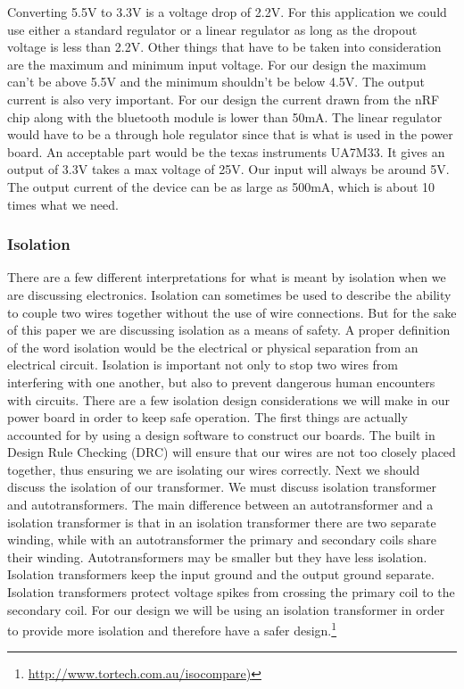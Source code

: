 Converting 5.5V to 3.3V is a voltage drop of 2.2V. For this application we
could use either a standard regulator or a linear regulator as long as the
dropout voltage is less than 2.2V. Other things that have to be taken into
consideration are the maximum and minimum input voltage. For our design the
maximum can{}'t be above 5.5V and the minimum shouldn{}'t be below 4.5V. The
output current is also very important. For our design the current drawn from
the nRF chip along with the bluetooth module is lower than 50mA. The linear
regulator would have to be a through hole regulator since that is what is used
in the power board. An acceptable part would be the texas instruments UA7M33.
It gives an output of 3.3V takes a max voltage of 25V. Our input will always be
around 5V. The output current of the device can be as large as 500mA, which is
about 10 times what we need.

\subsubsection{Isolation}
There are a few different interpretations for what is meant by isolation when
we are discussing electronics. Isolation can sometimes be used to describe the
ability to couple two wires together without the use of wire connections. But
for the sake of this paper we are discussing isolation as a means of safety. A
proper definition of the word isolation would be the electrical or physical
separation from an electrical circuit. Isolation is important not only to stop
two wires from interfering with one another, but also to prevent dangerous
human encounters with circuits. There are a few isolation design considerations
we will make in our power board in order to keep safe operation. The first
things are actually accounted for by using a design software to construct our
boards. The built in Design Rule Checking (DRC) will ensure that our wires are
not too closely placed together, thus ensuring we are isolating our wires
correctly. Next we should discuss the isolation of our transformer. We must
discuss isolation transformer and  autotransformers. The main difference
between an autotransformer and a isolation transformer is that in an isolation
transformer there are two separate winding, while with an autotransformer the
primary and secondary coils share their winding. Autotransformers may be
smaller but they have less isolation. Isolation transformers keep the input
ground and the output ground separate. Isolation transformers protect voltage
spikes from crossing the primary coil to the secondary coil. For our design we
will be using an isolation transformer in order to provide more isolation and
therefore have a safer
design.\footnote{\url{http://www.tortech.com.au/isocompare)}}


